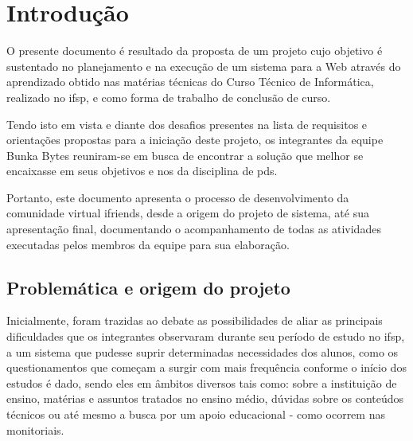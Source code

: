 
\chapter{Introdução}
O presente documento é resultado da proposta de um projeto cujo objetivo é sustentado no planejamento e na execução de um sistema para a Web através do aprendizado obtido nas matérias técnicas do Curso Técnico de Informática, realizado no \acs{ifsp}, e como forma de trabalho de conclusão de curso.

Tendo isto em vista e diante dos desafios presentes na lista de requisitos e orientações propostas para a iniciação deste projeto, os integrantes da equipe Bunka Bytes reuniram-se em busca de encontrar a solução que melhor se encaixasse em seus objetivos e nos da disciplina de \acs{pds}.

Portanto, este documento apresenta o processo de desenvolvimento da comunidade virtual \gls{ifriends}, desde a origem do projeto de sistema, até sua apresentação final, documentando o acompanhamento de todas as atividades executadas pelos membros da equipe para sua elaboração. 

\section{Problemática e origem do projeto}

Inicialmente, foram trazidas ao debate as possibilidades de aliar as principais dificuldades que os integrantes observaram durante seu período de estudo no \ac{ifsp}, a um sistema que pudesse suprir determinadas necessidades dos alunos, como os questionamentos que começam a surgir com mais frequência conforme o início dos estudos é dado, sendo eles em âmbitos diversos tais como: sobre a instituição de ensino, matérias e assuntos tratados no ensino médio, dúvidas sobre os conteúdos técnicos ou até mesmo a busca por um apoio educacional - como ocorrem nas monitoriais. 


